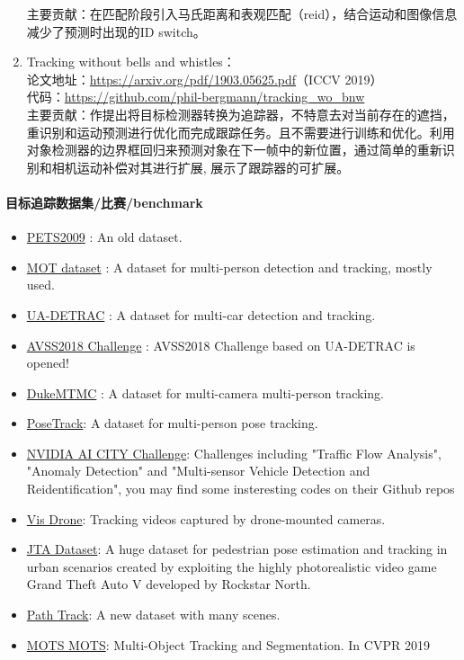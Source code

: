 \documentclass[lang=cn,11pt,a4paper]{elegant_template}
\begin{document}
\begin{enumerate}
    主要贡献：在匹配阶段引入马氏距离和表观匹配（reid），结合运动和图像信息减少了预测时出现的ID switch。
    \item Tracking without bells and whistles：\\ 
    论文地址：\href{https://arxiv.org/pdf/1903.05625.pdf}{https://arxiv.org/pdf/1903.05625.pdf}（ICCV 2019） \\
    代码：\href{https://github.com/phil-bergmann/tracking_wo_bnw}{https://github.com/phil-bergmann/tracking\_wo\_bnw}  \\
    主要贡献：作提出将目标检测器转换为追踪器，不特意去对当前存在的遮挡，重识别和运动预测进行优化而完成跟踪任务。且不需要进行训练和优化。利用对象检测器的边界框回归来预测对象在下一帧中的新位置，通过简单的重新识别和相机运动补偿对其进行扩展, 展示了跟踪器的可扩展。
\end{enumerate}

\paragraph{目标追踪数据集/比赛/benchmark} 
\begin{itemize}
\item \href{http://www.cvg.reading.ac.uk/PETS2009/a.html}{PETS2009} : An old dataset.
\item \href{https://motchallenge.net/}{MOT dataset} : A dataset for multi-person detection and tracking, mostly used.
\item \href{http://detrac-db.rit.albany.edu/}{UA-DETRAC} : A dataset for multi-car detection and tracking. 
\item \href{https://iwt4s2018.wordpress.com/challenge/}{AVSS2018 Challenge} : AVSS2018 Challenge based on UA-DETRAC is opened!
\item \href{http://vision.cs.duke.edu/DukeMTMC/}{DukeMTMC} : A dataset for multi-camera multi-person tracking. 
\item \href{https://posetrack.net/}{PoseTrack}: A dataset for multi-person pose tracking. 
\item \href{https://www.aicitychallenge.org/}{NVIDIA AI CITY Challenge}: Challenges including "Traffic Flow Analysis", "Anomaly Detection" and "Multi-sensor Vehicle Detection and Reidentification", you may find some insteresting codes on their Github repos
\item \href{http://www.aiskyeye.com/views/index}{Vis Drone}: Tracking videos captured by drone-mounted cameras.
\item \href{http://imagelab.ing.unimore.it/imagelab/page.asp?IdPage=25}{JTA Dataset}: A huge dataset for pedestrian pose estimation and tracking in urban scenarios created by exploiting the highly photorealistic video game Grand Theft Auto V developed by Rockstar North.
\item \href{http://people.ee.ethz.ch/~daid/pathtrack/}{Path Track}: A new dataset with many scenes.
\item \href{https://www.vision.rwth-aachen.de/page/mots}{MOTS MOTS}: Multi-Object Tracking and Segmentation. In CVPR 2019
\end{itemize}
\end{document}
